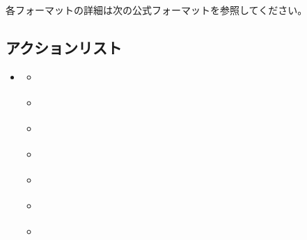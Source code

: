 \documentclass[letterpaper,10pt,dvipdfmx]{sphinxmanual}
\begin{document}
\sphinxAtStartPar
各フォーマットの詳細は次の公式フォーマットを参照してください。

\sphinxstepscope


\subsection{アクションリスト}
\label{\detokenize{auto/actionlist:act-act}}\label{\detokenize{auto/actionlist:id1}}\label{\detokenize{auto/actionlist::doc}}
\begin{sphinxShadowBox}
\begin{itemize}
\item {} 
\sphinxAtStartPar
{}\label{\detokenize{auto/actionlist:id59}}{\hyperref[\detokenize{auto/actionlist:id3}]{}}
\begin{itemize}
\item {} 
\sphinxAtStartPar
{}\label{\detokenize{auto/actionlist:id60}}{\hyperref[\detokenize{auto/actionlist:act-end}]{}}

\item {} 
\sphinxAtStartPar
{}\label{\detokenize{auto/actionlist:id61}}{\hyperref[\detokenize{auto/actionlist:act-charge}]{}}

\item {} 
\sphinxAtStartPar
{}\label{\detokenize{auto/actionlist:id62}}{\hyperref[\detokenize{auto/actionlist:act-draw}]{}}

\item {} 
\sphinxAtStartPar
{}\label{\detokenize{auto/actionlist:id63}}{\hyperref[\detokenize{auto/actionlist:act-attack}]{}}

\item {} 
\sphinxAtStartPar
{}\label{\detokenize{auto/actionlist:id64}}{\hyperref[\detokenize{auto/actionlist:act-block}]{}}

\item {} 
\sphinxAtStartPar
{}\label{\detokenize{auto/actionlist:id65}}{\hyperref[\detokenize{auto/actionlist:act-damagejudge}]{}}

\item {} 
\sphinxAtStartPar
{}\label{\detokenize{auto/actionlist:id66}}{\hyperref[\detokenize{auto/actionlist:act-nextgeneration}]{}}


\end{itemize}
\end{itemize}
\end{sphinxShadowBox}
\end{document}
